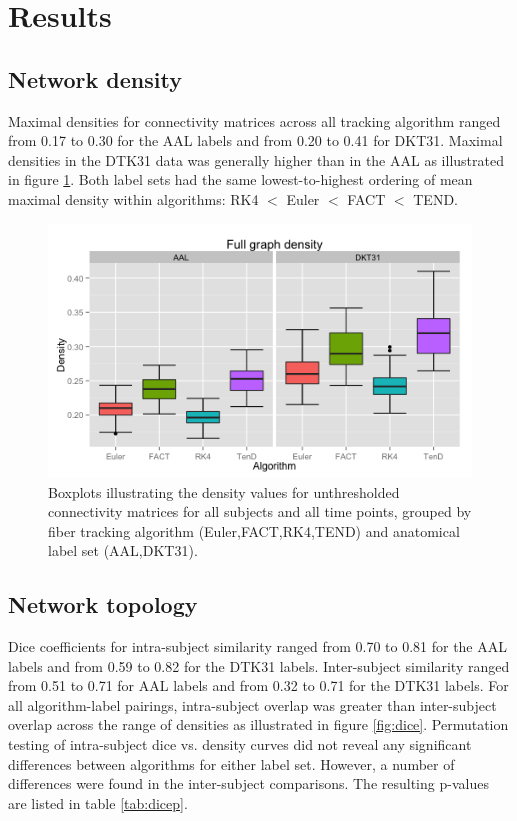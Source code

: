 \documentclass{frontiersSCNS} %
\begin{document}

\section{Results}
\subsection{Network density}
Maximal densities for connectivity matrices across all tracking
algorithm ranged from 0.17 to 0.30 for the AAL labels and from 0.20 to
0.41 for DKT31. Maximal densities in the DTK31 data was generally
higher than in the AAL as illustrated in figure
\ref{fig:density}. Both label sets had the same lowest-to-highest
ordering of mean maximal density within algorithms: RK4 $<$ Euler $<$
FACT $<$ TEND.


\begin{figure}
\begin{center}
\includegraphics[width=0.5\linewidth]{figures/density_plot.png} 
\caption{Boxplots illustrating the density values for unthresholded connectivity matrices for all subjects and all time points, grouped by fiber tracking algorithm (Euler,FACT,RK4,TEND) and anatomical label set (AAL,DKT31).}
\label{fig:density}
\end{center}
\end{figure}

\subsection{Network topology}
Dice coefficients for intra-subject similarity ranged from 0.70 to
0.81 for the AAL labels and from 0.59 to 0.82 for the DTK31
labels. Inter-subject similarity ranged from 0.51 to 0.71 for AAL
labels and from 0.32 to 0.71 for the DTK31 labels. For all
algorithm-label pairings, intra-subject overlap was greater than
inter-subject overlap across the range of densities as illustrated in
figure \ref{fig:dice}. Permutation testing of intra-subject dice
vs. density curves did not reveal any significant differences between
algorithms for either label set. However, a number of differences were
found in the inter-subject comparisons. The resulting p-values are
listed in table \ref{tab:dicep}. 
\end{document}
